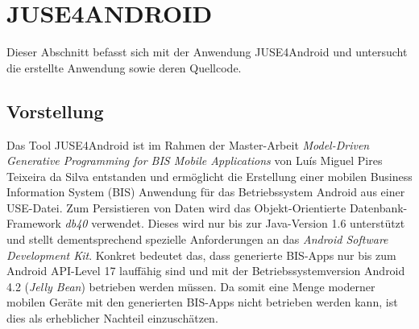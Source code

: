 \documentclass[a4paper,twoside]{article}
\begin{document}
\section{\uppercase{JUSE4Android}}
\label{JUSE4Android}
Dieser Abschnitt befasst sich mit der Anwendung JUSE4Android und untersucht die erstellte Anwendung sowie deren Quellcode. 



\subsection{Vorstellung}
Das Tool JUSE4Android ist im Rahmen der Master-Arbeit \textit{Model-Driven Generative Programming for BIS Mobile Applications} von Luís Miguel Pires Teixeira da Silva entstanden und ermöglicht die Erstellung einer mobilen Business Information System (BIS) Anwendung für das Betriebssystem Android aus einer USE-Datei. Zum Persistieren von Daten wird das Objekt-Orientierte Datenbank-Framework \textit{db40} verwendet. Dieses wird nur bis zur Java-Version 1.6 unterstützt und stellt dementsprechend spezielle Anforderungen an das \textit{Android Software Development Kit}. Konkret bedeutet das, dass generierte BIS-Apps nur bis zum Android API-Level 17 lauffähig sind und mit der Betriebssystemversion Android 4.2 (\textit{Jelly Bean}) betrieben werden müssen. Da somit eine Menge moderner mobilen Geräte mit den generierten BIS-Apps nicht betrieben werden kann, ist dies als erheblicher Nachteil einzuschätzen.
\end{document}
